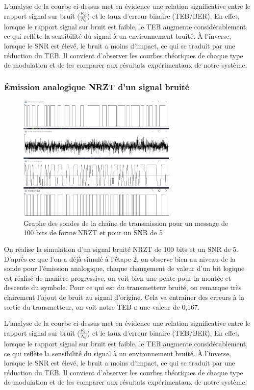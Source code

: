 L'analyse de la courbe ci-dessus met en évidence une relation significative entre le rapport signal sur bruit ($\frac{E_B}{N_0}$) et le taux d'erreur binaire (TEB/BER). En effet, lorsque le rapport signal sur bruit est faible, le TEB augmente considérablement, ce qui reflète la sensibilité du signal à un environnement bruité. À l'inverse, lorsque le SNR est élevé, le bruit a moins d'impact, ce qui se traduit par une réduction du TEB. Il convient d'observer les courbes théoriques de chaque type de modulation et de les comparer aux résultats expérimentaux de notre système.

\subsubsection{Émission analogique NRZT d'un signal bruité}
\begin{figure}[H]
    \centering
    \includegraphics[width=0.7\textwidth]{img/etape3_emission_NRZT_bruite.png}
    \caption{Graphe des sondes de la chaîne de transmission pour un message de 100 bits de forme NRZT et pour un SNR de 5}
    \label{fig:etape_3_NRZT_bruite}
\end{figure}

On réalise la simulation d'un signal bruité NRZT de 100 bits et un SNR de 5. D'après ce que l'on a déjà simulé à l'étape 2, on observe bien au niveau de la sonde pour l'émission analogique, chaque changement de valeur d'un bit logique est réalisé de manière progressive, on voit bien une pente pour la montée et descente du symbole. Pour ce qui est du transmetteur bruité, on remarque très clairement l'ajout de bruit au signal d'origine. Cela va entraîner des erreurs à la sortie du transmetteur, on voit notre TEB a une valeur de 0,167.

L'analyse de la courbe ci-dessus met en évidence une relation significative entre le rapport signal sur bruit ($\frac{E_B}{N_0}$) et le taux d'erreur binaire (TEB/BER). En effet, lorsque le rapport signal sur bruit est faible, le TEB augmente considérablement, ce qui reflète la sensibilité du signal à un environnement bruité. À l'inverse, lorsque le SNR est élevé, le bruit a moins d'impact, ce qui se traduit par une réduction du TEB. Il convient d'observer les courbes théoriques de chaque type de modulation et de les comparer aux résultats expérimentaux de notre système.


